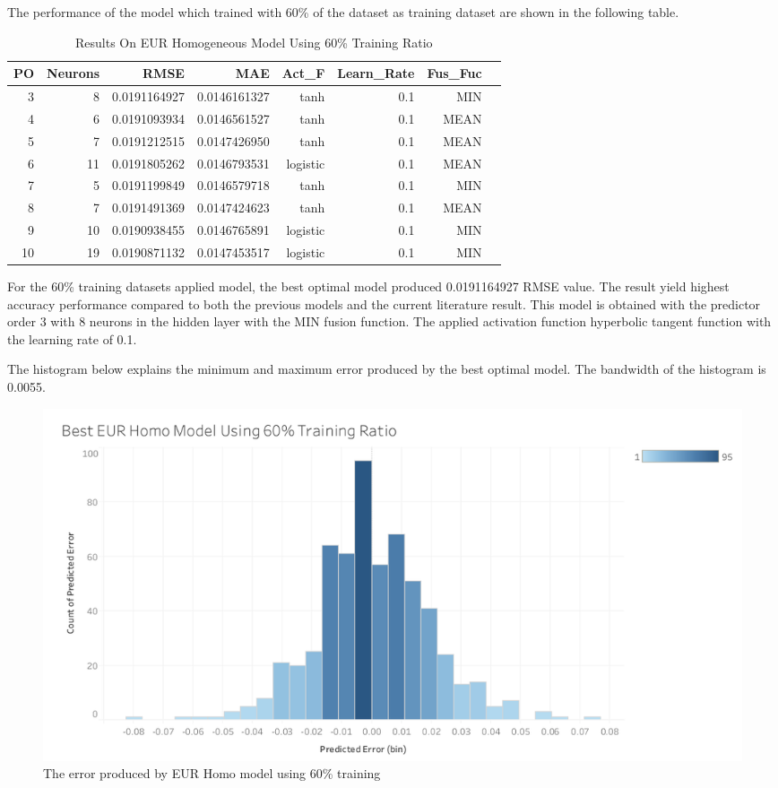 {{{{{{{{{{%
The performance of the model which trained with 60\% of the dataset as training dataset are shown in the following table. 
		
\setlength{\tabcolsep}{0.5em} %
{\renewcommand{\arraystretch}{1.2}
	\begin{table}[ht]
				\centering
				\begin{tabular}{@{}rrrrrrrr@{}}
					\toprule
					\textbf{PO}&\textbf{Neurons}& \textbf{RMSE} & \textbf{MAE} & \textbf{Act\_F}  & \textbf{Learn\_Rate}&\textbf{ Fus\_Fuc}\\ 
					\midrule
			 3 & 8 & 0.0191164927 & 0.0146161327 & tanh & 0.1 & MIN \\ 
			 4 & 6 & 0.0191093934 & 0.0146561527 & tanh & 0.1 & MEAN \\ 
			 5 & 7 & 0.0191212515 & 0.0147426950 & tanh & 0.1 & MEAN \\ 
			 6 & 11 & 0.0191805262 & 0.0146793531 & logistic & 0.1 & MEAN \\ 
			 7 & 5 & 0.0191199849 & 0.0146579718 & tanh & 0.1& MIN \\ 
			 8 & 7 & 0.0191491369 & 0.0147424623 & tanh & 0.1 & MEAN \\ 
			9 & 10 & 0.0190938455 & 0.0146765891 & logistic & 0.1 & MIN \\ 
		   10 & 19 & 0.0190871132 & 0.0147453517 & logistic & 0.1 & MIN \\			
			\hline
				\end{tabular}
				\hspace*{1cm}
				\caption{Results On EUR Homogeneous Model Using 60\% Training Ratio}
	\end{table}
			
For the 60\% training datasets applied model, the best optimal model produced 0.0191164927 RMSE value. The result yield highest  accuracy performance  compared to both the previous models and the current literature result. This model is obtained with the predictor order 3 with 8 neurons in the hidden layer with the MIN fusion function. The applied activation function hyperbolic tangent function with the learning rate of 0.1.
			
The histogram below explains the minimum and maximum error produced by the best optimal model. The bandwidth of the histogram is 0.0055.
			
	\begin{figure}[hbt!]\centering
			\includegraphics[width=1\textwidth]{homo_eur_60}
			\caption{The error produced by EUR Homo model using 60\%
				training}
	\end{figure}

}}}}}}}}}}}

